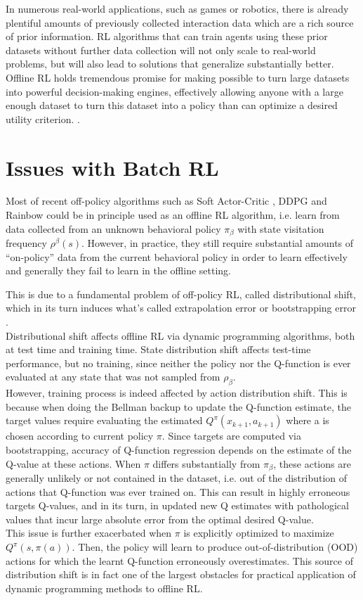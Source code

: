 In numerous real-world applications, such as games or robotics, there is already plentiful amounts 
of previously collected interaction data which are a rich source of prior information.
RL algorithms that can train agents using these prior datasets without further data collection
will not only scale to real-world problems, but will also lead to solutions that generalize substantially better.
Offline RL holds tremendous promise for making possible to turn large datasets into powerful 
decision-making engines, effectively allowing anyone with a large enough dataset to turn this dataset
into a policy than can optimize a desired utility criterion. \citep{levine2020}.


\section{Issues with Batch RL}

Most of recent off-policy algorithms such as Soft Actor-Critic \citep{Haarnoja2018}, 
DDPG \citep{Lillicrap2016} and Rainbow \citep{Hessel2018}  could be in principle used 
as an offline RL algorithm, i.e. learn from data collected from an unknown behavioral policy
$\pi_\beta$ with state visitation frequency $\rho^\beta(s)$. 
However, in practice, they still require substantial amounts
of “on-policy” data from the current behavioral policy in order to learn effectively 
and generally they fail to learn in the offline setting.

This is due to a fundamental problem of off-policy RL, called distributional shift, which in 
its turn induces what's called extrapolation error \citep{Fujimoto2019} or bootstrapping error \citet{Kumar2019}.\\
Distributional shift affects offline RL via dynamic programming algorithms, both at test time and training time.
State distribution shift affects test-time performance, but no training, since neither the policy nor
the Q-function is ever evaluated at any state that was not sampled from $\rho_\beta$.\\
However, training process is indeed affected by action distribution shift.
This is because when doing the Bellman backup to update the Q-function estimate,
the target values require evaluating the estimated $Q^\pi(x_{k+1},a_{k+1})$ where
a is chosen according to current policy $\pi$.
Since targets are computed via bootstrapping, accuracy of Q-function regression depends
on the estimate of the Q-value at these actions. When $\pi$ differs substantially from $\pi_\beta$, 
these actions are generally unlikely or not contained in the dataset, i.e.
out of the distribution of actions that Q-function was ever trained on. This can result
in highly erroneous targets Q-values, and in its turn, in updated new Q estimates 
with pathological values that incur large absolute error from the optimal desired Q-value.\\
This issue is further exacerbated when $\pi$ is explicitly optimized to maximize $Q^\pi(s,\pi(a))$.
Then, the policy will learn to produce out-of-distribution (OOD) actions
for which the learnt Q-function erroneously overestimates.
This source of distribution shift is in fact one of the largest obstacles for practical application
of dynamic programming methods to offline RL.

